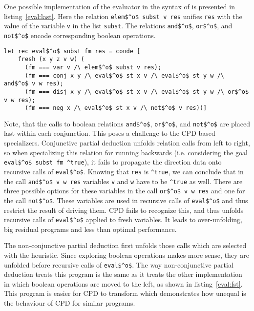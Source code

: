 One possible implementation of the evaluator in the syntax of \oc{} is presented in listing~\ref{eval:last}.
Here the relation \lstinline{elem$^o$ subst v res} unifies \lstinline{res} with the value of the variable \lstinline{v} in the list \lstinline{subst}.
The relations \lstinline{and$^o$}, \lstinline{or$^o$}, and \lstinline{not$^o$} encode corresponding boolean operations.

\begin{figure*}[!h]
  \centering
  \begin{minipage}{0.8\textwidth}
    \begin{lstlisting}[label={eval:last}, caption={Evaluator of formulas with boolean operation last}, captionpos=b, frame=tb]
  let rec eval$^o$ subst fm res = conde [
    fresh (x y z v w) (
      (fm === var v /\ elem$^o$ subst v res);
      (fm === conj x y /\ eval$^o$ st x v /\ eval$^o$ st y w /\ and$^o$ v w res);
      (fm === disj x y /\ eval$^o$ st x v /\ eval$^o$ st y w /\ or$^o$ v w res);
      (fm === neg x /\ eval$^o$ st x v /\ not$^o$ v res))]
    \end{lstlisting}
  \end{minipage}
\end{figure*}

Note, that the calls to boolean relations \lstinline{and$^o$}, \lstinline{or$^o$}, and \lstinline{not$^o$} are placed last within each conjunction.
This poses a challenge to the CPD-based specializers.
Conjunctive partial deduction unfolds relation calls from left to right, so when specializing this relation for running backwards (i.e. considering the goal \lstinline{eval$^o$ subst fm ^true}), it fails to propagate the direction data onto recursive calls of \lstinline{eval$^o$}.
Knowing that \lstinline{res} is \lstinline{^true}, we can conclude that in the call \lstinline{and$^o$ v w res} variables \lstinline{v} and \lstinline{w} have to be \lstinline{^true} as well.
There are three possible options for these variables in the call \lstinline{or$^o$ v w res} and one for the call \lstinline{not$^o$}.
These variables are used in recursive calls of \lstinline{eval$^o$} and thus restrict the result of driving them.
CPD fails to recognize this, and thus unfolds recursive calls of \lstinline{eval$^o$} applied to fresh variables.
It leads to over-unfolding, big residual programs and less than optimal performance.

The non-conjunctive partial deduction first unfolds those calls which are selected with the heuristic.
Since exploring boolean operations makes more sense, they are unfolded before recursive calls of \lstinline{eval$^o$}.
The way non-conjunctive partial deduction treats this program is the same as it treats the other implementation in which boolean operations are moved to the left, as shown in listing~\ref{eval:fst}.
This program is easier for CPD to transform which demonstrates how unequal is the behaviour of CPD for similar programs.


